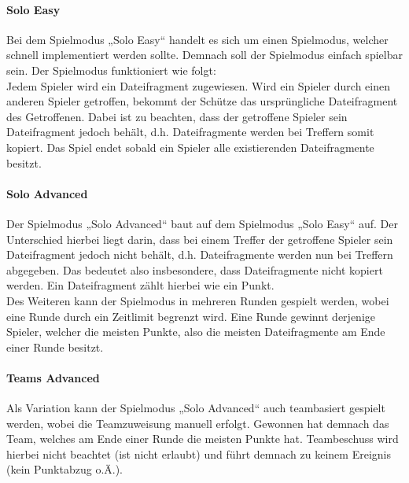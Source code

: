 \paragraph{Solo Easy}
Bei dem Spielmodus „Solo Easy“ handelt es sich um einen Spielmodus, welcher schnell implementiert werden sollte. Demnach soll der Spielmodus einfach spielbar sein. Der Spielmodus funktioniert wie folgt: \\
Jedem Spieler wird ein Dateifragment zugewiesen. Wird ein Spieler durch einen anderen Spieler getroffen, bekommt der Schütze das ursprüngliche Dateifragment des Getroffenen. Dabei ist zu beachten, dass der getroffene Spieler sein Dateifragment jedoch behält, d.h. Dateifragmente werden bei Treffern somit kopiert. Das Spiel endet sobald ein Spieler alle existierenden Dateifragmente besitzt.

\paragraph{Solo Advanced}
Der Spielmodus „Solo Advanced“ baut auf dem Spielmodus „Solo Easy“ auf. Der Unterschied hierbei liegt darin, dass bei einem Treffer der getroffene Spieler sein Dateifragment jedoch nicht behält, d.h. Dateifragmente werden nun bei Treffern abgegeben. Das bedeutet also insbesondere, dass Dateifragmente nicht kopiert werden. Ein Dateifragment zählt hierbei wie ein Punkt. \\
Des Weiteren kann der Spielmodus in mehreren Runden gespielt werden, wobei eine Runde durch ein Zeitlimit begrenzt wird. Eine Runde gewinnt derjenige Spieler, welcher die meisten Punkte, also die meisten Dateifragmente am Ende einer Runde besitzt.

\paragraph{Teams Advanced}
Als Variation kann der Spielmodus „Solo Advanced“ auch teambasiert gespielt werden, wobei die Teamzuweisung manuell erfolgt. Gewonnen hat demnach das Team, welches am Ende einer Runde die meisten Punkte hat. Teambeschuss wird hierbei nicht beachtet (ist nicht erlaubt) und führt demnach zu keinem Ereignis (kein Punktabzug o.Ä.).

